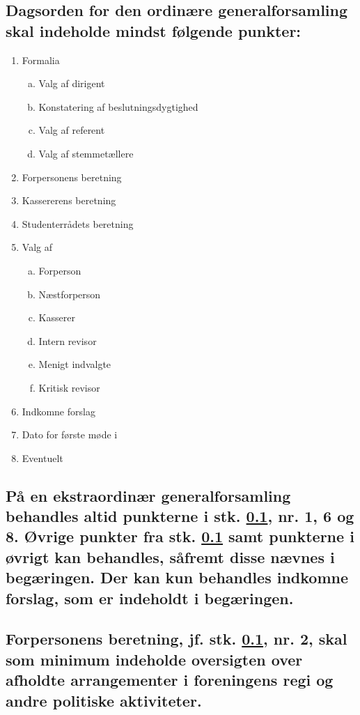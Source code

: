 \documentclass[10pt]{article}
\newcommand{\fagr}{\text{Fagrådet Sigma}}
\begin{document}
\subsection{Dagsorden for den ordinære generalforsamling skal indeholde mindst følgende punkter:}\label{4:1}

\begin{enumerate}[1), nosep]
\item Formalia

	\begin{enumerate}[a., nosep]
	\item Valg af dirigent
	\item Konstatering af beslutningsdygtighed
	\item Valg af referent
	\item Valg af stemmetællere
	\end{enumerate}
\item Forpersonens beretning
\item Kassererens beretning
\item Studenterrådets beretning
\item Valg af
	\begin{enumerate}[a., nosep]
	\item Forperson
	\item Næstforperson
	\item Kasserer
	\item Intern revisor
	\item Menigt indvalgte
	\item Kritisk revisor
	\end{enumerate}
\item Indkomne forslag
\item Dato for første møde i \fagr{}
\item Eventuelt
\end{enumerate}

\subsection{På en ekstraordinær generalforsamling behandles altid punkterne i stk. \ref{4:1}, nr. 1, 6 og 8. Øvrige punkter fra stk. \ref{4:1} samt punkterne i øvrigt kan behandles, såfremt disse nævnes i begæringen. Der kan kun behandles indkomne forslag, som er indeholdt i begæringen.}

\subsection{Forpersonens beretning, jf. stk. \ref{4:1}, nr. 2, skal som minimum indeholde oversigten over afholdte arrangementer i foreningens regi og andre politiske aktiviteter.}
\end{document}
